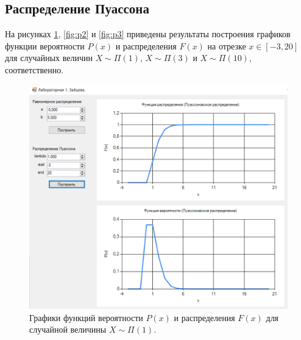 \documentclass[14pt, a4paper]{extarticle}
\begin{document}
\subsection{Распределение Пуассона}

На рисунках \ref{fig:p1}, \ref{fig:p2} и \ref{fig:p3} приведены результаты построения графиков функции вероятности $P(x)$ и распределения $F(x)$ на отрезке $x \in [-3, 20]$ для случайных величин $X \sim \Pi(1)$, $X \sim \Pi(3)$ и $X \sim \Pi(10)$, соответственно.

\clearpage
\begin{figure}[h!]
	\begin{center}
		\includegraphics[scale=0.7]{pictures/p1.png}
	\end{center}
	\captionsetup{justification=centering}
	\caption{Графики функций вероятности $P(x)$ и распределения $F(x)$ для случайной величины $X \sim \Pi(1)$.}
	\label{fig:p1}
\end{figure}
\end{document}
